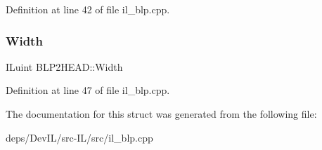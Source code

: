Definition at line 42 of file il\+\_\+blp.\+cpp.

\mbox{\label{structBLP2HEAD_abb241e1828c6789906f347ee7a141e6b}} 
\subsubsection{\texorpdfstring{Width}{Width}}
{\footnotesize\ttfamily I\+Luint B\+L\+P2\+H\+E\+A\+D\+::\+Width}



Definition at line 47 of file il\+\_\+blp.\+cpp.



The documentation for this struct was generated from the following file\+:\begin{DoxyCompactItemize}
\item 
deps/\+Dev\+I\+L/src-\/\+I\+L/src/il\+\_\+blp.\+cpp\end{DoxyCompactItemize}
